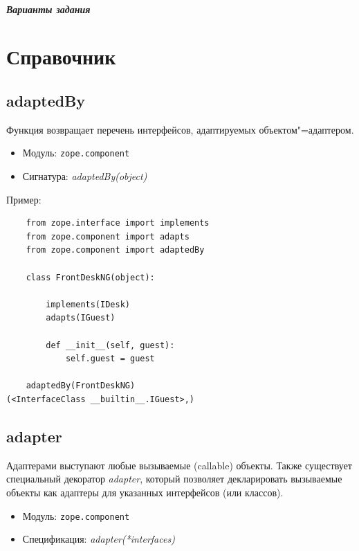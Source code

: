\documentclass[a4paper,openany,twoside,final]{book}
\providecommand*{\DUroletitlereference}[1]{\textsl{#1}}
\begin{document}
\paragraph{Варианты задания}
\newpage


\chapter{Справочник%
  \label{id54}%
}


\section*{adaptedBy%
  \label{adaptedby}%
}

Функция возвращает перечень интерфейсов, адаптируемых объектом"=адаптером.

\begin{itemize}

\item Модуль: \texttt{zope.component}

\item Сигнатура: \DUroletitlereference{adaptedBy(object)}

\end{itemize}

Пример:

\begin{verbatim}
    from zope.interface import implements
    from zope.component import adapts
    from zope.component import adaptedBy

    class FrontDeskNG(object):

        implements(IDesk)
        adapts(IGuest)

        def __init__(self, guest):
            self.guest = guest

    adaptedBy(FrontDeskNG)
(<InterfaceClass __builtin__.IGuest>,)
\end{verbatim}


\section*{adapter%
  \label{id55}%
}

Адаптерами выступают любые вызываемые (callable) объекты.  Также существует специальный декоратор \DUroletitlereference{adapter}, который позволяет декларировать вызываемые объекты как адаптеры для указанных интерфейсов (или классов).

\begin{itemize}

\item Модуль: \texttt{zope.component}

\item Спецификация: \DUroletitlereference{adapter(*interfaces)}

\end{itemize}
\end{document}
